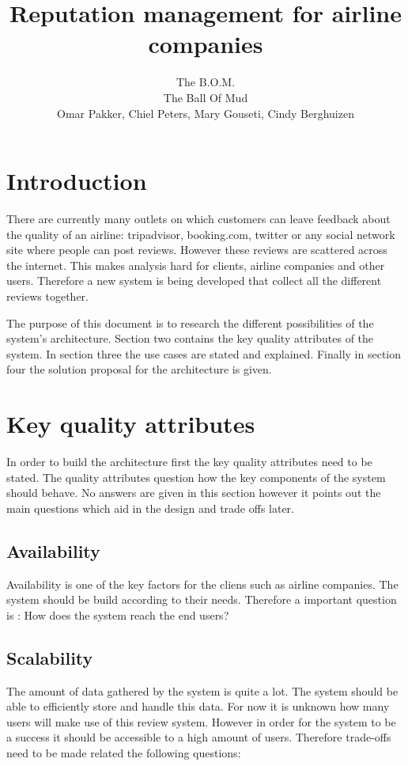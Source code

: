 \documentclass{article}
\author{ The B.O.M. \\
\small{The Ball Of Mud}\\
\small{Omar Pakker, Chiel Peters, Mary Gouseti, Cindy Berghuizen}}
\title{Reputation management for airline companies}
\begin{document}
\maketitle

\section*{Introduction}

There are currently many outlets on which customers can leave feedback about the quality of an airline: tripadvisor, booking.com, twitter or any social network site where people can post reviews. However these reviews are scattered across the internet. This makes analysis hard for clients, airline companies and other users. Therefore a new system is being developed that collect all the different reviews together.

The purpose of this document is to research the different possibilities of the system's architecture. Section two contains the key quality attributes of the system. In section three the use cases are stated and explained. Finally in section four the solution proposal for the architecture is given.

\section*{Key quality attributes}

In order to build the architecture first the key quality attributes need to be stated. The quality attributes question how the key components of the system should behave. No answers are given in this section however it points out the main questions which aid in the design and trade offs later.

\subsection*{Availability}
Availability is one of the key factors for the cliens such as airline companies. The system should be build according to their needs. Therefore a important question is : How does the system reach the end users?

\subsection*{Scalability}
The amount of data gathered by the system is quite a lot. The system should be able to efficiently store and handle this data. 
For now it is unknown how many users will make use of this review system. However in order for the system to be a success it should be accessible to a high amount of users. Therefore trade-offs need to be made related the following questions:
\end{document}
